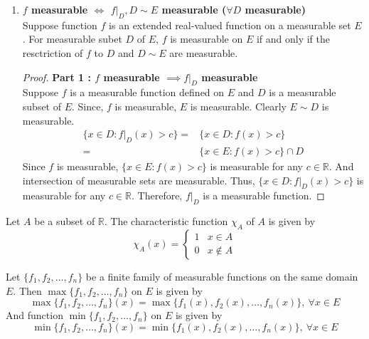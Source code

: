 \begin{enumerate}
\begin{proof}
		Clearly, $\{ x \in A : g(x) > c \}$ is a subset of a set of measurse zero and thus measurable.
                Also, $E \sim A$ measurable since both $E$ and $A$ are measurable.
		And since $f$ is measurable, $\{ x \in E : f(x) > c\}$ is measurable.
                Thus, $\{ x \in E : g(x) > c\}$ is measurable for any $c \in \mathbb{R}$.
		Therefore, $g$ is a measurable function.
	\end{proof}
\item \textbf{$f$ measurable $\iff$ $f|_D, D \sim E$ measurable ($\forall D$ measurable)}\\
	Suppose function $f$ is an extended real-valued function on a measurable set $E$.
	For measurable subet $D$ of $E$, $f$ is measurable on $E$ if and only if the resctriction of $f$ to $D$ and $D \sim E$ are measurable.
	\begin{proof}
		\textbf{Part 1 : $f$ measurable $\implies f|_D$ measurable}\\
   		Suppose $f$ is a measurable function defined on $E$ and $D$ is a measurable subset of $E$.
		Since, $f$ is measurable, $E$ is measurable.
		Clearly $E \sim D$ is measurable.
		\begin{align*}
			\{ x \in D : f|_D(x) > c \} = & \{ x \in D : f(x) > c \} \\
			= & \{ x \in E : f(x) > c\} \cap D
		\end{align*}
		Since $f$ is measurable, $\{ x \in E : f(x) > c\}$ is measurable for any $c \in \mathbb{R}$.
		And intersection of measurable sets are measurable.
		Thus, $\{ x \in D : f|_D(x) > c\}$ is measurable for any $c \in \mathbb{R}$.
		Therefore, $f|_D$ is a measurable function.
	\end{proof}
\end{enumerate}

\begin{definition}
	Let $A$ be a subset of $\mathbb{R}$.
	The characteristic function $\chi_A$ of $A$ is given by
	\begin{equation}
		\chi_A(x) = \begin{cases} 1 & x \in A \\ 0 & x \notin A  \end{cases}
	\end{equation}
\end{definition}
\begin{definition}
	Let $\{f_1,f_2,\dots,f_n \}$ be a finite family of measurable functions on the same domain $E$.
	Then $\max\{f_1,f_2,\dots,f_n\}$ on $E$ is given by
	\begin{equation}
	\max\{f_1,f_2,\dots,f_n\}(x) = \max\{f_1(x),f_2(x),\dots,f_n(x)\},\ \forall x \in E
	\end{equation}
	And function $\min\{f_1,f_2,\dots,f_n\}$ on $E$ is given by
	\begin{equation}
	\min\{f_1,f_2,\dots,f_n\}(x) = \min\{f_1(x),f_2(x),\dots,f_n(x)\},\ \forall x \in E
	\end{equation}
\end{definition}
